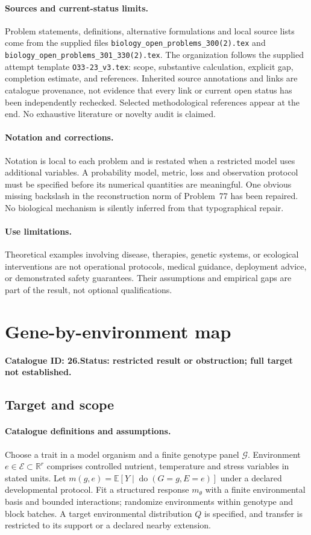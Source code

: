 \documentclass[11pt]{article}
\newcommand{\R}{\mathbb R}
\newcommand{\E}{\mathbb E}
\providecommand{\R}{\mathbb R}
\providecommand{\E}{\mathbb E}
\begin{document}
\paragraph{Sources and current-status limits.}
Problem statements, definitions, alternative formulations and local source lists
come from the supplied files
\texttt{biology\_open\_problems\_300(2).tex} and
\texttt{biology\_open\_problems\_301\_330(2).tex}.
The organization follows the supplied attempt template
\texttt{O33-23\_v3.tex}: scope, substantive calculation, explicit gap,
completion estimate, and references. Inherited source annotations and links are
catalogue provenance, not evidence that every link or current open status has
been independently rechecked. Selected methodological references appear at the
end. No exhaustive literature or novelty audit is claimed.

\paragraph{Notation and corrections.}
Notation is local to each problem and is restated when a restricted model uses
additional variables. A probability model, metric, loss and observation protocol
must be specified before its numerical quantities are meaningful. One obvious
missing backslash in the reconstruction norm of Problem~77 has been repaired.
No biological mechanism is silently inferred from that typographical repair.

\paragraph{Use limitations.}
Theoretical examples involving disease, therapies, genetic systems, or ecological
interventions are not operational protocols, medical guidance, deployment advice,
or demonstrated safety guarantees. Their assumptions and empirical gaps are part
of the result, not optional qualifications.

\setcounter{section}{25}
\section{Gene-by-environment map}
\label{prob:026}
\noindent\textbf{Catalogue ID: 26.}\quad \textbf{Status: restricted result or obstruction; full target not established.}
\subsection{Target and scope}
\paragraph{Catalogue definitions and assumptions.}
Choose a trait in a model organism and a finite genotype panel $\mathcal G$. Environment $e\in\mathcal E\subset\R^r$ comprises controlled nutrient, temperature and stress variables in stated units. Let $m(g,e)=\E[Y\mid\operatorname{do}(G=g,E=e)]$ under a declared developmental protocol. Fit a structured response $m_\theta$ with a finite environmental basis and bounded interactions; randomize environments within genotype and block batches. A target environmental distribution $Q$ is specified, and transfer is restricted to its support or a declared nearby extension.
\end{document}
